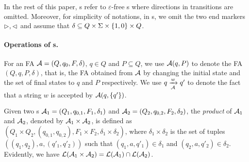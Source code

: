 In the rest of this paper, \FA{}s refer to $\varepsilon$-free \FA{}s where directions in transitions are omitted. Moreover, for simplicity of notations, in \FA{}s, we omit the two end markers $\vartriangleright, \vartriangleleft$ and assume that $\delta \subseteq Q \times \Sigma \times    \{1,0\} \times Q$. 

\paragraph{Operations of \FA{}s.} For an FA $\mathcal{A}=(Q, q_0, F, \delta)$, $q \in Q$ and $P \subseteq Q$, we use $\mathcal{A}(q, P)$ to denote the FA $(Q, q, P, \delta)$, that is, the FA obtained from $\mathcal{A}$ by changing the initial state and the set of final states to $q$ and $P$ respectively. We use $q \xrightarrow[\mathcal{A}]{w} q'$ to denote the fact that a string $w$ is accepted by $\mathcal{A}(q, \{q'\})$. 


Given two \FA{}s $\mathcal{A}_1 = (Q_1, q_{0,1}, F_{1}, \delta_1)$ and $\mathcal{A}_2 = (Q_2, q_{0,2}, F_2, \delta_2)$, the \emph{product} of $\mathcal{A}_1$ and $\mathcal{A}_2$, denoted by $\mathcal{A}_1 \times \mathcal{A}_2$, is defined as $(Q_1 \times Q_2, (q_{0,1}, q_{0,2}), F_1 \times F_2, \delta_1 \times \delta_2)$, where $\delta_1 \times \delta_2$ is the set of tuples $((q_1,q_2), a, (q'_1, q'_2))$ such that $(q_1, a, q'_1) \in \delta_1$ and $(q_2, a, q'_2) \in \delta_2$. Evidently, we have $\mathcal{L}(\mathcal{A}_1 \times \mathcal{A}_2) = \mathcal{L}(\mathcal{A}_1) \cap \mathcal{L}(\mathcal{A}_2)$.
%
%
%


